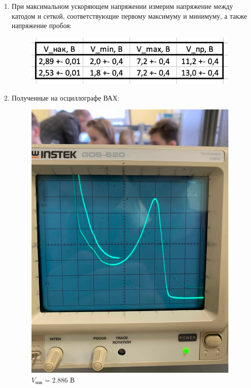 \documentclass[a4paper, 12pt]{article}%
\begin{document}
\begin{enumerate}

\item При максимальном ускоряющем напряжении измерим напряжение между катодом и сеткой,  соответствующие первому максимуму и минимуму,  а также напряжение пробоя:

	\begin{figure}[h!]
		\centering
		\includegraphics[scale=1]{Таблица_1.PNG}
	\end{figure}

\item Полученные на осциллографе ВАХ:

	\begin{figure}[h!]
		\centering
		\includegraphics[scale=0.13]{Фото_1.PNG}
		\caption{$V_{\text{нак}} = 2.886$ В}
	\end{figure}
	

\end{enumerate}
\end{document}
